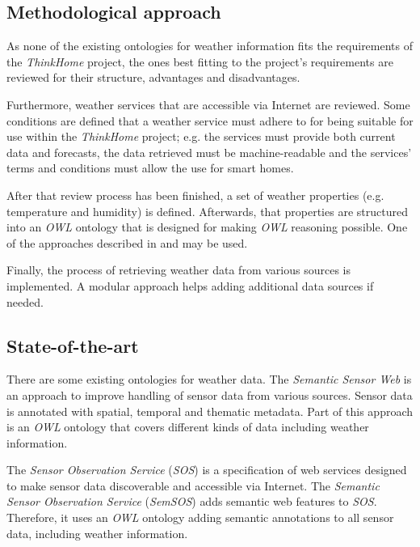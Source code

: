 \documentclass{scrartcl}
\begin{document}
\subsection*{Methodological approach}
As none of the existing ontologies for weather information fits the requirements of the \textit{ThinkHome} project, the ones best fitting to the project's requirements are reviewed for their structure, advantages and disadvantages.

Furthermore, weather services that are accessible via Internet are reviewed.
Some conditions are defined that a weather service must adhere to for being suitable for use within the \textit{ThinkHome} project;
e.g. the services must provide both current data and forecasts, the data retrieved must be machine-readable and the services' terms and conditions must allow the use for smart homes.

After that review process has been finished, a set of weather properties (e.g. temperature and humidity) is defined.
Afterwards, that properties are structured into an \textit{OWL} ontology that is designed for making \textit{OWL} reasoning possible.
One of the approaches described in \cite{Ontology101} and \cite{SoftwareEngineeringOntology} may be used.

Finally, the process of retrieving weather data from various sources is implemented. A modular approach helps adding additional data sources if needed.

\subsection*{State-of-the-art}

There are some existing ontologies for weather data. The \textit{Semantic Sensor Web} \cite{SemanticSensorWeb} is an approach to improve handling of sensor data from various sources.
Sensor data is annotated with spatial, temporal and thematic metadata. Part of this approach is an \textit{OWL} ontology that covers different kinds of data including weather information.

The \textit{Sensor Observation Service} (\textit{SOS}) \cite{SOS} is a specification of web services designed to make sensor data discoverable and accessible via Internet.
The \textit{Semantic Sensor Observation Service} (\textit{SemSOS}) \cite{SemSOS} adds semantic web features to \textit{SOS}.
Therefore, it uses an \textit{OWL} ontology adding semantic annotations to all sensor data, including weather information.
\end{document}
